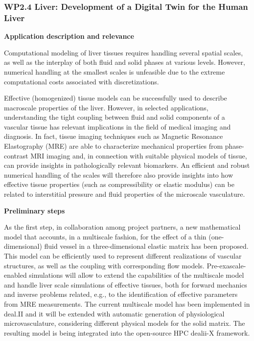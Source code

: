 \documentclass[a4paper,12pt, numbers]{article}
\begin{document}
\subsubsection*{WP2.4 Liver: Development of a Digital Twin for the Human Liver}

\noindent\textbf{Application description and relevance}

Computational modeling of liver tissues requires handling several spatial scales, as well as the interplay of both fluid and solid phases at various levels.
However, numerical handling at the smallest scales is unfeasible due to the extreme computational costs associated with discretizations.

Effective (homogenized) tissue models can be successfully used to describe macroscale properties of the liver.
However, in selected applications, understanding the tight coupling between fluid and solid components of a vascular tissue has relevant implications in the field of medical imaging and diagnosis.
In fact, tissue imaging techniques such as Magnetic Resonance Elastography (MRE) are able to characterize mechanical properties from phase-contrast MRI imaging and, in connection with suitable physical models of tissue, can provide insights in pathologically relevant biomarkers.
An efficient and robust numerical handling of the scales will therefore also provide insights into how effective tissue properties (such as compressibility or elastic modulus) can be related to interstitial pressure and fluid properties of the microscale vasculature.

\noindent\textbf{Preliminary steps}

As the first step, in collaboration among project partners, a new mathematical model that accounts, in a multiscale fashion, for the effect of a thin (one-dimensional) fluid vessel in a three-dimensional elastic matrix has been proposed.
This model can be efficiently used to represent different realizations of vascular structures, as well as the coupling with corresponding flow models.
Pre-exascale-enabled simulations will allow to extend the capabilities of the multiscale model and handle liver scale simulations of effective tissues, both for forward mechanics and inverse problems related, e.g., to the identification of effective parameters from MRE measurements.
The current multiscale model has been implemented in deal.II and it will be extended with automatic generation of physiological microvasculature, considering different physical models for the solid matrix.
The resulting model is being integrated into the open-source HPC dealii-X framework.
\end{document}
